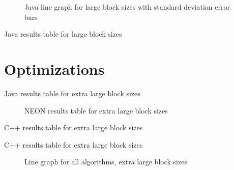 \begin{figure}
    \centering
    
    \caption{Java line graph for large block sizes with standard deviation error bars}
    \label{fig:java:line:large}
\end{figure}
\begin{table}
    \centering
    \caption{Java results table for large block sizes}
    \label{tab:java:large}
    
\end{table}

\section{Optimizations}

\begin{table}
    \centering
    \caption{Java results table for extra large block sizes}
    \label{tab:java:extra}
    
\end{table}

\begin{figure}
    \centering
    
    \caption{NEON results table for extra large block sizes}
    \label{fig:neon:line:extra}
\end{figure}

\begin{table}
    \centering
    
    \caption{C++ results table for extra large block sizes}
    \label{tab:neon:extra}
\end{table}

\begin{table}
    \centering
    \resizebox{\columnwidth}{!}{
        
    }
    \caption{C++ results table for extra large block sizes}
    \label{tab:cpp:extra}
\end{table}

\begin{figure}
    \centering
    
    \caption{Line graph for all algorithms, extra large block sizes}
    \label{fig:all:line:extra}
\end{figure}

